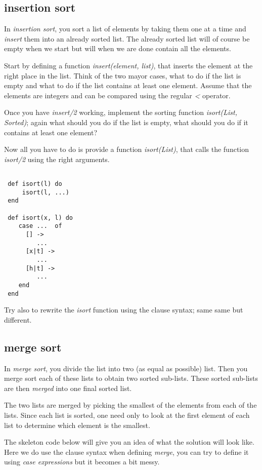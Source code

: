\documentclass[a4paper,11pt]{article}
\begin{document}
{\subsection{insertion sort}

In {\em insertion sort}, you sort a list of elements by taking them
one at a time and {\em insert} them into an already sorted list. The
already sorted list will of course be empty when we start but will
when we are done contain all the elements.

Start by defining a function {\em insert(element, list)}, that inserts
the element at the right place in the list. Think of the two mayor
cases, what to do if the list is empty and what to do if the list
contains at least one element. Assume that the elements are integers
and can be compared using the regular {\em <} operator.


Once you have {\em insert/2} working, implement the sorting function
{\em isort(List, Sorted)}; again what should you do if the list is
empty, what should you do if it contains at least one element?

Now all you have to do is provide a function {\em isort(List)}, that
calls the function {\em isort/2} using the right arguments.

\begin{verbatim}

 def isort(l) do 
     isort(l, ...)
 end

 def isort(x, l) do
    case ...  of
      [] -> 
         ...
      [x|t] ->
         ...
      [h|t] ->
         ...
    end
 end
\end{verbatim}

Try also to rewrite the {\em isort} function using the clause syntax;
same same but different.


\subsection{merge sort}

In {\em merge sort}, you divide the list into two (as equal as
possible) list. Then you merge sort each of these lists to obtain two
sorted sub-lists. These sorted sub-lists are then {\em merged} into
one final sorted list. 

The two lists are merged by picking the smallest of the elements from
each of the lists. Since each list is sorted, one need only to look at
the first element of each list to determine which element is the
smallest.

The skeleton code below will give you an idea of what the solution
will look like. Here we do use the clause syntax when defining {\em
  merge}, you can try to define it using {\em case expressions} but it
becomes a bit messy.

}
\end{document}
